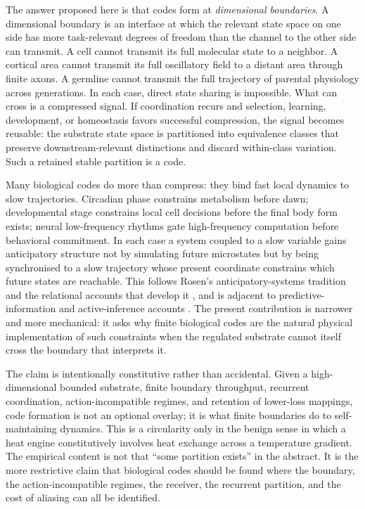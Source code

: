 \documentclass[12pt]{article}
\theoremstyle{definition}
\begin{document}
The answer proposed here is that codes form at \emph{dimensional boundaries}. A dimensional boundary is an interface at which the relevant state space on one side has more task-relevant degrees of freedom than the channel to the other side can transmit. A cell cannot transmit its full molecular state to a neighbor. A cortical area cannot transmit its full oscillatory field to a distant area through finite axons. A germline cannot transmit the full trajectory of parental physiology across generations. In each case, direct state sharing is impossible. What can cross is a compressed signal. If coordination recurs and selection, learning, development, or homeostasis favors successful compression, the signal becomes reusable: the substrate state space is partitioned into equivalence classes that preserve downstream-relevant distinctions and discard within-class variation. Such a retained stable partition is a code.

Many biological codes do more than compress: they bind fast local dynamics to slow trajectories. Circadian phase constrains metabolism before dawn; developmental stage constrains local cell decisions before the final body form exists; neural low-frequency rhythms gate high-frequency computation before behavioral commitment. In each case a system coupled to a slow variable gains anticipatory structure not by simulating future microstates but by being synchronised to a slow trajectory whose present coordinate constrains which future states are reachable. This follows Rosen's anticipatory-systems tradition and the relational accounts that develop it \citep{rosen1985,igamberdiev1993,igamberdiev2014,igamberdiev2021}, and is adjacent to predictive-information and active-inference accounts \citep{bialek2001,friston2010}. The present contribution is narrower and more mechanical: it asks why finite biological codes are the natural physical implementation of such constraints when the regulated substrate cannot itself cross the boundary that interprets it.

The claim is intentionally constitutive rather than accidental. Given a high-dimensional bounded substrate, finite boundary throughput, recurrent coordination, action-incompatible regimes, and retention of lower-loss mappings, code formation is not an optional overlay; it is what finite boundaries do to self-maintaining dynamics. This is a circularity only in the benign sense in which a heat engine constitutively involves heat exchange across a temperature gradient. The empirical content is not that ``some partition exists'' in the abstract. It is the more restrictive claim that biological codes should be found where the boundary, the action-incompatible regimes, the receiver, the recurrent partition, and the cost of aliasing can all be identified.
\end{document}
